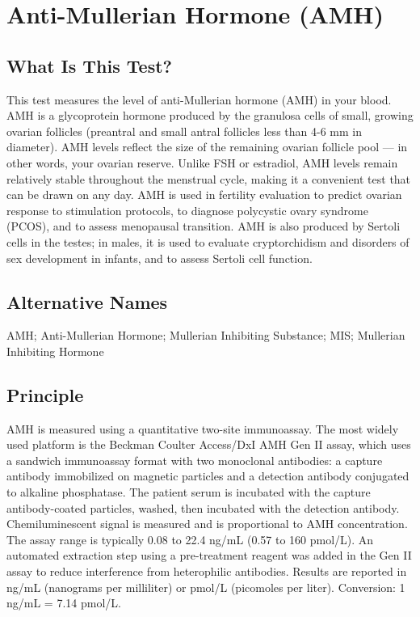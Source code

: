 \chapter{Anti-Mullerian Hormone (AMH)}

\section*{What Is This Test?}
This test measures the level of anti-Mullerian hormone (AMH) in your blood. AMH is a glycoprotein hormone produced by the granulosa cells of small, growing ovarian follicles (preantral and small antral follicles less than 4-6 mm in diameter). AMH levels reflect the size of the remaining ovarian follicle pool --- in other words, your ovarian reserve. Unlike FSH or estradiol, AMH levels remain relatively stable throughout the menstrual cycle, making it a convenient test that can be drawn on any day. AMH is used in fertility evaluation to predict ovarian response to stimulation protocols, to diagnose polycystic ovary syndrome (PCOS), and to assess menopausal transition. AMH is also produced by Sertoli cells in the testes; in males, it is used to evaluate cryptorchidism and disorders of sex development in infants, and to assess Sertoli cell function.

\section*{Alternative Names}
AMH; Anti-Mullerian Hormone; Mullerian Inhibiting Substance; MIS; Mullerian Inhibiting Hormone

\section*{Principle}
AMH is measured using a quantitative two-site immunoassay. The most widely used platform is the Beckman Coulter Access/DxI AMH Gen II assay, which uses a sandwich immunoassay format with two monoclonal antibodies: a capture antibody immobilized on magnetic particles and a detection antibody conjugated to alkaline phosphatase. The patient serum is incubated with the capture antibody-coated particles, washed, then incubated with the detection antibody. Chemiluminescent signal is measured and is proportional to AMH concentration. The assay range is typically 0.08 to 22.4 ng/mL (0.57 to 160 pmol/L). An automated extraction step using a pre-treatment reagent was added in the Gen II assay to reduce interference from heterophilic antibodies. Results are reported in ng/mL (nanograms per milliliter) or pmol/L (picomoles per liter). Conversion: 1 ng/mL = 7.14 pmol/L.

